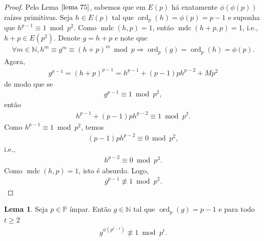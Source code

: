 \documentclass[a4paper,11pt,twoside, leqno]{article}
\DeclareMathOperator{\mdc}{mdc}
\DeclareMathOperator{\Ord}{ord}
\theoremstyle{definition}
\newtheorem{lemma}[theorem]{Lema}
\begin{document}
\begin{proof}
	Pelo Lema $\eqref{lema 75}$, sabemos que em $E(p)$ há exatamente $\phi(\phi(p))$ raízes primitivas. Seja $h\in E(p)$ tal que $\Ord_p(h) = \phi(p) = p-1$ e suponha que $h^{p-1}\equiv 1\bmod p^2$. Como $\mdc(h,p) = 1$, então $\mdc(h+p,p) = 1$, i.e., $h+p\in E(p^2)$. Denote $g = h+p$ e note que
	\begin{align*}
	\forall m\in\mathbb{N}, h^m\equiv g^m\equiv (h+p)^m\bmod p \Rightarrow \Ord_p(g) = \Ord_p(h) = \phi(p).
	\end{align*}
	Agora,
	\begin{align*}
	g^{p-1} = (h+p)^{p-1} = h^{p-1} + (p-1)ph^{p-2} + Mp^2
	\end{align*}
	de modo que se 
	\begin{align*}
	g^{p-1}\equiv 1\bmod p^2,
	\end{align*}
	então 
	\begin{align*}
	h^{p-1} + (p-1)ph^{p-2}\equiv 1\bmod p^2.
	\end{align*}
	Como $h^{p-1}\equiv 1\bmod p^2$, temos 
	\begin{align*}
	(p-1)ph^{p-2}\equiv 0\bmod p^2,
	\end{align*}
	i.e.,
	\begin{align*}
	h^{p-2}\equiv 0\bmod p^2.
	\end{align*}
	Como $\mdc(h,p) = 1$, isto é absurdo. Logo, 
	\begin{align*}
	g^{p-1}\not\equiv 1\bmod p^2.	
	\end{align*}
\end{proof}
\begin{lemma}
	\label{lema 77}
	Seja $p\in\mathbb{P}$ ímpar. Então $g\in\mathbb{N}$ tal que $\Ord_p(g) = p-1$ e para todo $t\geq 2$
	\begin{align*}
	g^{\phi(p^{t-1})}\not\equiv 1\bmod p^t.
	\end{align*}
\end{lemma}
\end{document}
